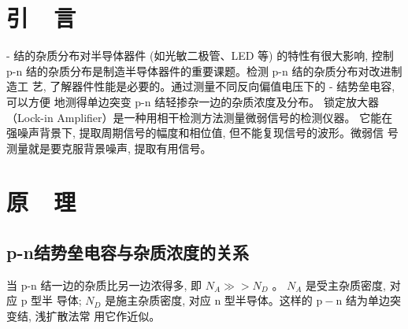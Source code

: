 \documentclass{buaaemp}
\begin{document}



\wuhao 

\section{引~~言}
-  结的杂质分布对半导体器件 (如光敏二极管、LED 等) 的特性有很大影响, 控制 p-n 结的杂质分布是制造半导体器件的重要课题。检测 p-n 结的杂质分布对改进制造工 艺, 了解器件性能是必要的。通过测量不同反向偏值电压下的  -  结势垒电容, 可以方便 地测得单边突变  p-n  结轻掺杂一边的杂质浓度及分布。
锁定放大器（Lock-in Amplifier）是一种用相干检测方法测量微弱信号的检测仪器。 它能在强噪声背景下, 提取周期信号的幅度和相位值, 但不能复现信号的波形。微弱信 号测量就是要克服背景噪声, 提取有用信号。\cite{钱建强2016近代物理实验}


\section{原~~理}
\subsection{p-n结势垒电容与杂质浓度的关系}
当  p-n  结一边的杂质比另一边浓得多, 即 $ N_{A} \gg>N_{D} $ 。 $ N_{A}$  是受主杂质密度, 对应  p  型半 导体; $ N_{D} $ 是施主杂质密度, 对应  $\mathrm{n}$  型半导体。这样的 $ \mathrm{p}-\mathrm{n} $ 结为单边突变结, 浅扩散法常 用它作近似。
\end{document}
